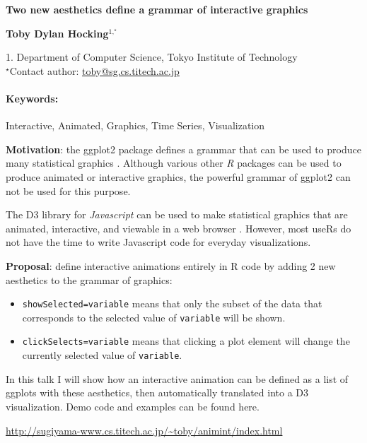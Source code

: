 \documentclass[11pt, a4paper]{article}
\newcommand{\pkg}[1]{{\normalfont\fontseries{b}\selectfont #1}}
\let\proglang=\textit
\let\code=\texttt
\renewcommand{\title}[1]{\begin{center}{\bf \LARGE #1}\end{center}}
\newcommand{\keywords}{\paragraph{Keywords:}}
\begin{document}
\pagestyle{empty}

\title{Two new aesthetics define a grammar of interactive graphics}

\begin{center}
  {\bf Toby Dylan Hocking$^{1,^\star}$}
\end{center}

\begin{affiliations}
  1. Department of Computer Science, Tokyo Institute of Technology \\[-2pt]
  $^\star$Contact author:
  \href{mailto:toby@sg.cs.titech.ac.jp}{toby@sg.cs.titech.ac.jp}
\end{affiliations}

\keywords Interactive, Animated, Graphics, Time Series, Visualization

\vskip 0.8cm

\textbf{Motivation}: the \pkg{ggplot2} package defines a grammar that
can be used to produce many statistical graphics
\citep{ggplot2}. Although various other \proglang{R} packages can be
used to produce animated or interactive graphics, the powerful
grammar of \pkg{ggplot2} can not be used for this purpose.

The \pkg{D3} library for \proglang{Javascript} can be used to make
statistical graphics that are animated, interactive, and viewable in a
web browser \citep{D3}. However, most useRs do not have the time to
write Javascript code for everyday visualizations.

\textbf{Proposal}: define interactive animations entirely in R code by
adding 2 new aesthetics to the grammar of graphics:
\begin{itemize}
\item \code{showSelected=variable} means that only the subset of the
  data that corresponds to the selected value of \code{variable} will
  be shown.
\item \code{clickSelects=variable} means that clicking a plot element
  will change the currently selected value of \code{variable}.
\end{itemize}

In this talk I will show how an interactive animation can be defined
as a list of ggplots with these aesthetics, then automatically
translated into a D3 visualization. Demo code and examples can be
found here.

\url{http://sugiyama-www.cs.titech.ac.jp/~toby/animint/index.html}



\end{document}
